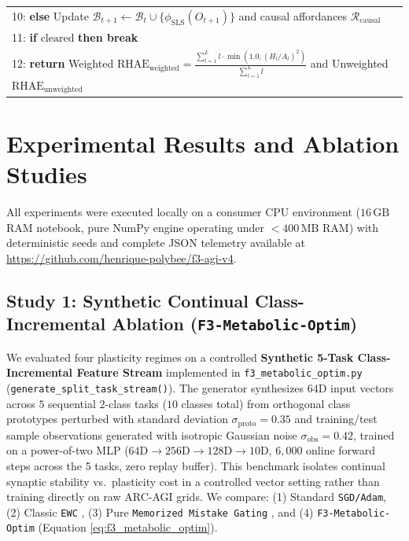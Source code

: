 \documentclass[10pt,a4paper]{article}
\begin{document}
\begin{table}[htbp]
{\begin{tabularx}{\textwidth}{X}
10: \hspace{2.4em} \textbf{else} Update $\mathcal{B}_{t+1} \leftarrow \mathcal{B}_t \cup \{\phi_{\text{SLS}}(O_{t+1})\}$ and causal affordances $\mathcal{R}_{\text{causal}}$ \\
11: \hspace{2.4em} \textbf{if} $\text{cleared}$ \textbf{then break} \\
12: \textbf{return} Weighted $\text{RHAE}_{\text{weighted}} = \frac{\sum_{l=1}^L l \cdot \min(1.0, (H_l / A_l)^2)}{\sum_{l=1}^L l}$ and Unweighted $\text{RHAE}_{\text{unweighted}}$ \\
\bottomrule
\end{tabularx}%
}
\end{table}

\section{Experimental Results and Ablation Studies}

All experiments were executed locally on a consumer CPU environment ($16\,\text{GB}$ RAM notebook, pure NumPy engine operating under $<400\,\text{MB}$ RAM) with deterministic seeds and complete JSON telemetry available at \url{https://github.com/henrique-polybee/f3-agi-v4}.

\subsection{Study 1: Synthetic Continual Class-Incremental Ablation (\texttt{F3-Metabolic-Optim})}
\label{sec:exp_metabolic}

We evaluated four plasticity regimes on a controlled \textbf{Synthetic 5-Task Class-Incremental Feature Stream} implemented in \texttt{f3\_metabolic\_optim.py} (\texttt{generate\_split\_task\_stream()}). The generator synthesizes $64\text{D}$ input vectors across $5$ sequential $2$-class tasks ($10$ classes total) from orthogonal class prototypes perturbed with standard deviation $\sigma_{\text{proto}} = 0.35$ and training/test sample observations generated with isotropic Gaussian noise $\sigma_{\text{obs}} = 0.42$, trained on a power-of-two MLP ($64\text{D} \to 256\text{D} \to 128\text{D} \to 10\text{D}$, $6,000$ online forward steps across the 5 tasks, zero replay buffer). This benchmark isolates continual synaptic stability vs.\ plasticity cost in a controlled vector setting rather than training directly on raw ARC-AGI grids. We compare: (1) Standard \texttt{SGD/Adam}, (2) Classic \texttt{EWC} \cite{kirkpatrick2017overcoming}, (3) Pure \texttt{Memorized Mistake Gating} \cite{vanrossum2025mistake}, and (4) \texttt{F3-Metabolic-Optim} (Equation \ref{eq:f3_metabolic_optim}).
\end{document}
